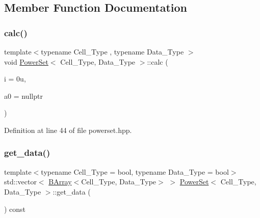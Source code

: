 \subsection{Member Function Documentation}
\mbox{\label{class_power_set_a93e31ba8891642db6ecf0fca82c71f6a}} 
\subsubsection{\texorpdfstring{calc()}{calc()}}
{\footnotesize\ttfamily template$<$typename Cell\+\_\+\+Type , typename Data\+\_\+\+Type $>$ \\
void \hyperlink{class_power_set}{Power\+Set}$<$ Cell\+\_\+\+Type, Data\+\_\+\+Type $>$\+::calc (\begin{DoxyParamCaption}\item[{\hyperlink{typedefs_8hpp_a91ad9478d81a7aaf2593e8d9c3d06a14}{uint}}]{i = {\ttfamily 0u},  }\item[{\hyperlink{class_b_array}{B\+Array}$<$ Cell\+\_\+\+Type, Data\+\_\+\+Type $>$ $\ast$}]{a0 = {\ttfamily nullptr} }\end{DoxyParamCaption})\hspace{0.3cm}{\ttfamily [inline]}}



Definition at line 44 of file powerset.\+hpp.

\mbox{\label{class_power_set_aa1700af475e219c59a5969a89a0d80d3}} 
\subsubsection{\texorpdfstring{get\+\_\+data()}{get\_data()}}
{\footnotesize\ttfamily template$<$typename Cell\+\_\+\+Type  = bool, typename Data\+\_\+\+Type  = bool$>$ \\
std\+::vector$<$ \hyperlink{class_b_array}{B\+Array}$<$Cell\+\_\+\+Type, Data\+\_\+\+Type$>$ $>$ \hyperlink{class_power_set}{Power\+Set}$<$ Cell\+\_\+\+Type, Data\+\_\+\+Type $>$\+::get\+\_\+data (\begin{DoxyParamCaption}{ }\end{DoxyParamCaption}) const\hspace{0.3cm}{\ttfamily [inline]}}



